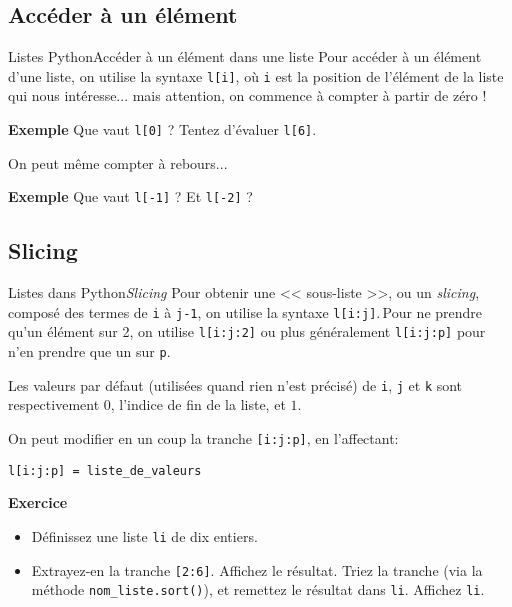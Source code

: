 \documentclass[10pt]{beamer}
\begin{document}
\subsection{Accéder à un élément}

\begin{frame}[fragile]{Listes Python}{Accéder à un élément dans une liste}
	Pour accéder à un élément d'une liste, on utilise la syntaxe \lstinline|l[i]|, où \lstinline|i| est la position de l'élément de la liste qui nous intéresse... mais attention, on commence à compter à partir de zéro !
	\pause
	
	\begin{block}{\textbf{Exemple}}
		Que vaut \lstinline|l[0]| ? Tentez d'évaluer \lstinline|l[6]|.
	\end{block}
	\pause
	
	On peut même compter à rebours...
	\begin{block}{\textbf{Exemple}}
		Que vaut \lstinline|l[-1]| ? Et \lstinline|l[-2]| ?
	\end{block}
\end{frame}

\subsection{Slicing}

\begin{frame}[fragile]{Listes dans Python}{\textit{Slicing}}
	Pour obtenir une << sous-liste >>, ou un \textit{slicing}, composé des termes de \lstinline|i| à \lstinline|j-1|, on utilise la syntaxe \lstinline|l[i:j]|.\pause \,Pour ne prendre qu'un élément sur 2, on utilise \lstinline|l[i:j:2]| ou plus généralement \lstinline|l[i:j:p]| pour n'en prendre que un sur \lstinline|p|.\pause 
	
	Les valeurs par défaut (utilisées quand rien n'est précisé) de \lstinline|i|, \lstinline|j| et \lstinline|k| sont respectivement $0$, l'indice de fin de la liste, et $1$.\pause
	
	On peut modifier en un coup la tranche \lstinline|[i:j:p]|, en l'affectant:
	\begin{lstlisting}l[i:j:p] = liste_de_valeurs
	\end{lstlisting}
	
	\begin{block}{\textbf{Exercice}}
	\begin{itemize}[<+->]
	\item Définissez une liste \lstinline|li| de dix entiers.
	\item Extrayez-en la tranche \lstinline|[2:6]|. Affichez le résultat. Triez la tranche (via la méthode \lstinline|nom_liste.sort()|), et remettez le résultat dans \lstinline|li|. Affichez \lstinline|li|.
	\end{itemize}
	\end{block}
\end{frame}
\end{document}
